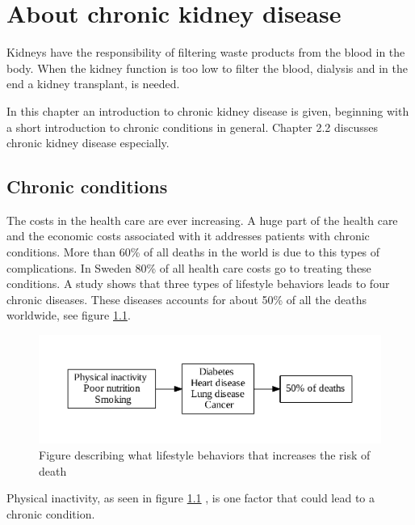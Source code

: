 \documentclass{cslthse-msc}
\begin{document}

\chapter{About chronic kidney disease}

Kidneys have the responsibility of filtering waste products from the blood in the body\cite{NKDEPBASICS}. When the kidney function is too low to filter the blood, dialysis and in the end a kidney transplant, is needed.

In this chapter an introduction to chronic kidney disease is given, beginning with a short introduction to chronic conditions in general. Chapter 2.2 discusses chronic kidney disease especially.
  
\section{Chronic conditions}
\label{sec:chronic}

The costs in the health care are ever increasing. A huge part of the health care and the economic costs associated with it addresses patients with chronic conditions. More than 60\% of all deaths in the world is due to this types of complications. In Sweden 80\% of all health care costs go to treating these conditions\cite{SmartCare}. A study shows that three types of lifestyle behaviors  leads to four chronic diseases. These diseases accounts for about 50\% of all the deaths worldwide, see figure \ref{fig:chronic-fig}\cite{callaway2015quantified}.

\begin{figure}[!hbt]
\centering
\includegraphics[scale=0.8]{chronic-fig.pdf} 
\caption{Figure  describing what lifestyle behaviors that increases the risk of death}\label{fig:chronic-fig}
\end{figure}

Physical inactivity, as seen in figure \ref{fig:chronic-fig} , is one factor that could lead to a chronic condition. 
\end{document}
